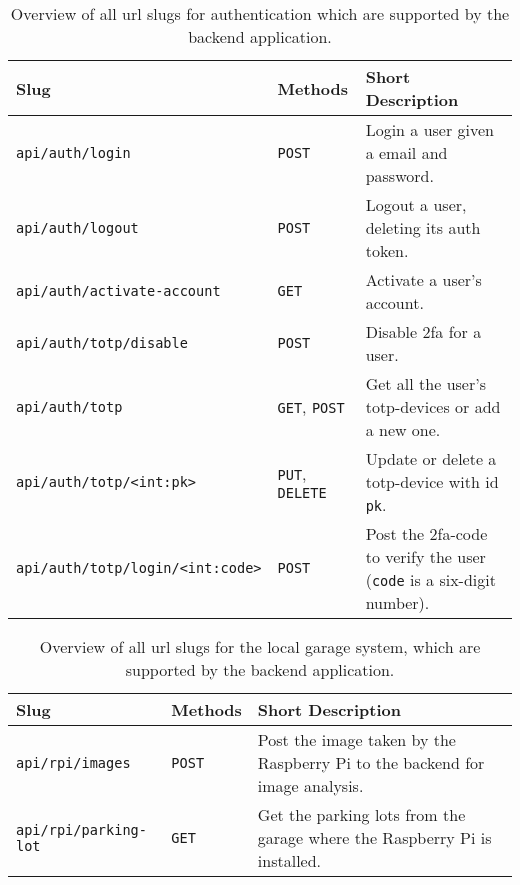 \begin{table}[htp]
    \centering
    \begin{tabular}{|l|l|p{7cm}|}
    \hline
    \textbf{Slug} & \textbf{Methods} & \textbf{Short Description}  \\
    \hline
    \hline
        \texttt{api/auth/login} &  \texttt{POST} & Login a user given a email and password.\\
        \hline
        \texttt{api/auth/logout} &  \texttt{POST} & Logout a user, deleting its auth token.\\
        \hline
        \texttt{api/auth/activate-account} &  \texttt{GET} & Activate a user's account.\\
        \hline
        \texttt{api/auth/totp/disable} &  \texttt{POST} & Disable \ac{2fa} for a user.\\
        \hline
        \texttt{api/auth/totp} &  \texttt{GET}, \texttt{POST} & Get all the user's \ac{totp}-devices or add a new one.\\
        \hline
        \texttt{api/auth/totp/<int:pk>} &  \texttt{PUT}, \texttt{DELETE} & Update or delete a \ac{totp}-device with id \texttt{pk}.\\
        \hline
        \texttt{api/auth/totp/login/<int:code>} & \texttt{POST} & Post the \ac{2fa}-code to verify the user (\texttt{code} is a six-digit number).\\
        \hline
    \end{tabular}
    \caption{Overview of all \ac{url} slugs for authentication which are supported by the backend application.}
    \label{tab:auth-url}
\end{table}


\begin{table}[ht!]
    \centering
    \begin{tabular}{|l|l|p{7cm}|}
        \hline
    \textbf{Slug} & \textbf{Methods} & \textbf{Short Description}  \\
    \hline
        \hline
        \texttt{api/rpi/images} &  \texttt{POST} & Post the image taken by the Raspberry Pi to the backend for image analysis.\\
        \hline
        \texttt{api/rpi/parking-lot} &  \texttt{GET} & Get the parking lots from the garage where the Raspberry Pi is installed.\\
        \hline
            \end{tabular}
    \caption{Overview of all \ac{url} slugs for the local garage system, which are supported by the backend application.}
    \label{tab:url-rpi}
\end{table}


